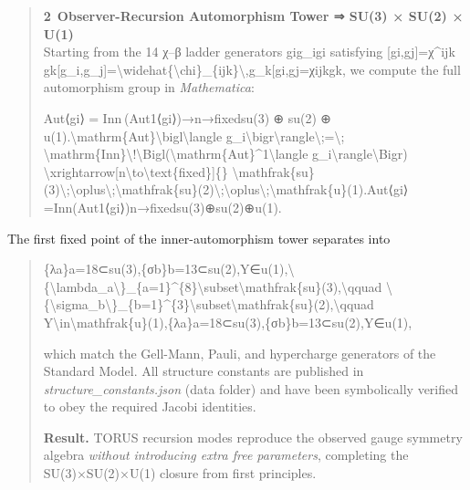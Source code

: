 \documentclass[
]{article}
\begin{document}
\begin{quote}
\textbf{2 Observer-Recursion Automorphism Tower ⇒ SU(3) × SU(2) ×
U(1)}\\
Starting from the 14 χ--β ladder generators gig\_igi\hspace{0pt}
satisfying
{[}gi,gj{]}=χ\^{}ijk gk{[}g\_i,g\_j{]}=\textbackslash widehat\{\textbackslash chi\}\_\{ijk\}\textbackslash,g\_k{[}gi\hspace{0pt},gj\hspace{0pt}{]}=χ\hspace{0pt}ijk\hspace{0pt}gk\hspace{0pt},
we compute the full automorphism group in \emph{Mathematica}:

Aut⟨gi⟩  =  Inn ⁣(Aut1⟨gi⟩)→n→fixedsu(3)  ⊕  su(2)  ⊕  u(1).\textbackslash mathrm\{Aut\}\textbackslash bigl\textbackslash langle
g\_i\textbackslash bigr\textbackslash rangle\textbackslash;=\textbackslash;
\textbackslash mathrm\{Inn\}\textbackslash!\textbackslash Bigl(\textbackslash mathrm\{Aut\}\^{}1\textbackslash langle
g\_i\textbackslash rangle\textbackslash Bigr)
\textbackslash xrightarrow{[}n\textbackslash to\textbackslash text\{fixed\}{]}\{\}
\textbackslash mathfrak\{su\}(3)\textbackslash;\textbackslash oplus\textbackslash;\textbackslash mathfrak\{su\}(2)\textbackslash;\textbackslash oplus\textbackslash;\textbackslash mathfrak\{u\}(1).Aut⟨gi\hspace{0pt}⟩=Inn(Aut1⟨gi\hspace{0pt}⟩)n→fixed\hspace{0pt}su(3)⊕su(2)⊕u(1).
\end{quote}

The first fixed point of the inner-automorphism tower separates into

\begin{quote}
\{λa\}a=18⊂su(3),\{σb\}b=13⊂su(2),Y∈u(1),\textbackslash\{\textbackslash lambda\_a\textbackslash\}\_\{a=1\}\^{}\{8\}\textbackslash subset\textbackslash mathfrak\{su\}(3),\textbackslash qquad
\textbackslash\{\textbackslash sigma\_b\textbackslash\}\_\{b=1\}\^{}\{3\}\textbackslash subset\textbackslash mathfrak\{su\}(2),\textbackslash qquad
Y\textbackslash in\textbackslash mathfrak\{u\}(1),\{λa\hspace{0pt}\}a=18\hspace{0pt}⊂su(3),\{σb\hspace{0pt}\}b=13\hspace{0pt}⊂su(2),Y∈u(1),

which match the Gell-Mann, Pauli, and hypercharge generators of the
Standard Model. All structure constants are published in
\emph{structure\_constants.json} (data folder) and have been
symbolically verified to obey the required Jacobi identities.

\textbf{Result.} TORUS recursion modes reproduce the observed gauge
symmetry algebra \emph{without introducing extra free parameters},
completing the SU(3)×SU(2)×U(1) closure from first principles.
\end{quote}
\end{document}
